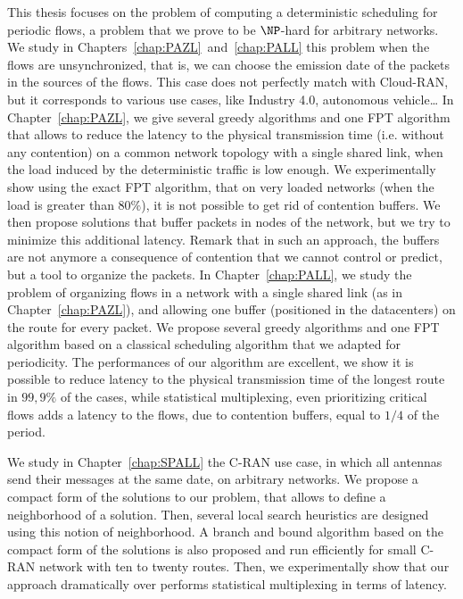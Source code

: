  This thesis focuses on the problem of computing a deterministic scheduling for periodic flows, a problem that we prove to be $\NP$-hard for arbitrary networks.
 We study in Chapters~\ref{chap:PAZL}~and~\ref{chap:PALL} this problem when the flows are unsynchronized, that is, we can choose the emission date of the packets in the sources of the flows. This case does not perfectly match with Cloud-RAN, but it corresponds to various use cases, like Industry 4.0, autonomous vehicle\dots
In Chapter~\ref{chap:PAZL}, we give several greedy algorithms and one FPT algorithm that allows to reduce the latency to the physical transmission time (i.e. without any contention) on a common network topology with a single shared link, when the load induced by the deterministic traffic is low enough. We experimentally show using the exact FPT algorithm, that on very loaded networks (when the load is greater than $80\%$), it is not possible to get rid of contention buffers. 
We then propose solutions that buffer packets in nodes of the network, but we try to minimize this additional latency. Remark that in such an approach, the buffers are not anymore a consequence of contention that we cannot control or predict, but a tool to organize the packets.
In Chapter~\ref{chap:PALL}, we study the problem of organizing flows in a network with a single shared link (as in Chapter~\ref{chap:PAZL}), and allowing one buffer (positioned in the datacenters) on the route for every packet. We propose several greedy algorithms and one FPT algorithm based on a classical scheduling algorithm that we adapted for periodicity. The performances of our algorithm are excellent, we show it is possible to reduce latency to the physical transmission time of the longest route in $99,9\%$ of the cases, while statistical multiplexing, even prioritizing critical flows adds a latency to the flows, due to contention buffers, equal to $1/4$ of the period.

We study in Chapter~\ref{chap:SPALL} the C-RAN use case, in which all antennas send their messages at the same date, on arbitrary networks. We propose a compact form of the solutions to our problem, that allows to define a neighborhood of a solution. Then, several local search heuristics are designed using this notion of neighborhood. A branch and bound algorithm based 
on the compact form of the solutions is also proposed and run efficiently for small C-RAN network with ten to twenty routes. Then, we experimentally show that our approach dramatically over performs statistical multiplexing in terms of latency.

